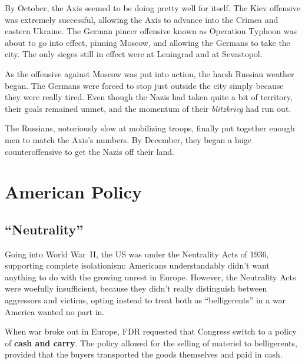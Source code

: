 By October, the Axis seemed to be doing pretty well for itself.
The Kiev offensive was extremely successful,
allowing the Axis to advance into the Crimea and eastern Ukraine.
The German pincer offensive known as Operation Typhoon was about to go into effect, pinning Moscow,
and allowing the Germans to take the city.
The only sieges still in effect were at Leningrad and at Sevastopol.

As the offensive against Moscow was put into action, the harsh Russian weather began.
The Germans were forced to stop just outside the city simply because they were really tired.
Even though the Nazis had taken quite a bit of territory,
their goals remained unmet, and the momentum of their \textit{blitzkrieg} had run out.

The Russians, notoriously slow at mobilizing troops,
finally put together enough men to match the Axis's numbers.
By December, they began a huge counteroffensive to get the Nazis off their land.

\section{American Policy}

\subsection*{``Neutrality''}

Going into World War~II, the US was under the Neutrality Acts of 1936,
supporting complete isolationism:
Americans understandably didn't want anything to do with the growing unrest in Europe.
However, the Neutrality Acts were woefully insufficient,
because they didn't really distinguish between aggressors and victims,
opting instead to treat both as ``belligerents'' in a war America wanted no part in.

When war broke out in Europe,
FDR requested that Congress switch to a policy of \textbf{cash and carry}.
The policy allowed for the selling of materiel to belligerents,
provided that the buyers transported the goods themselves and paid in cash.

